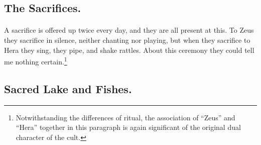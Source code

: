 \documentclass[a4paper, 11pt, oneside, polutonikogreek, english]{article}
\begin{document}
\subsection{The Sacrifices.}
\paragraph{}
A sacrifice is offered up twice every day, and they are all present at this. To Zeus they sacrifice in silence, neither chanting nor playing, but when they sacrifice to Hera they sing, they pipe, and shake rattles. About this ceremony they could tell me nothing certain.\footnote{Notwithstanding the differences of ritual, the association of ``Zeus'' and ``Hera'' together in this paragraph is again significant of the original dual character of the cult.}

\subsection{Sacred Lake and Fishes.}
\end{document}
